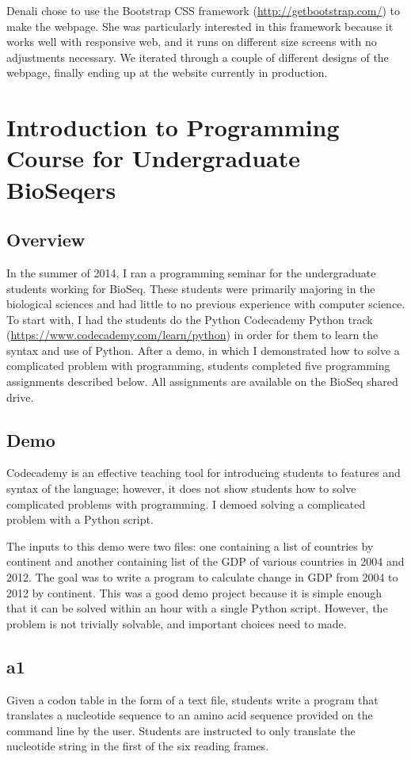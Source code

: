 \documentclass{report}
\begin{document}
Denali chose to use the Bootstrap CSS framework (\url{http://getbootstrap.com/}) to make the webpage. She was particularly interested in this framework because it works well with responsive web, and it runs on different size screens with no adjustments necessary. We iterated through a couple of different designs of the webpage, finally ending up at the website currently in production.

\section{Introduction to Programming Course for Undergraduate BioSeqers}
\subsection{Overview}
In the summer of 2014, I ran a programming seminar for the undergraduate students working for BioSeq. These students were primarily majoring in the biological sciences and had little to no previous experience with computer science. To start with, I had the students do the Python Codecademy Python track (\url{https://www.codecademy.com/learn/python}) in order for them to learn the syntax and use of Python. After a demo, in which I demonstrated how to solve a complicated problem with programming, students completed five programming assignments described below. All assignments are available on the BioSeq shared drive.

\subsection{Demo}
Codecademy is an effective teaching tool for introducing students to features and syntax of the language; however, it does not show students how to solve complicated problems with programming. I demoed solving a complicated problem with a Python script.

The inputs to this demo were two files: one containing a list of countries by continent and another containing list of the GDP of various countries in 2004 and 2012. The goal was to write a program to calculate change in GDP from 2004 to 2012 by continent. This was a good demo project because it is simple enough that it can be solved within an hour with a single Python script. However, the problem is not trivially solvable, and important choices need to made.

\subsection{a1}
Given a codon table in the form of a text file, students write a program that translates a nucleotide sequence to an amino acid sequence provided on the command line by the user. Students are instructed to only translate the nucleotide string in the first of the six reading frames.
\end{document}
